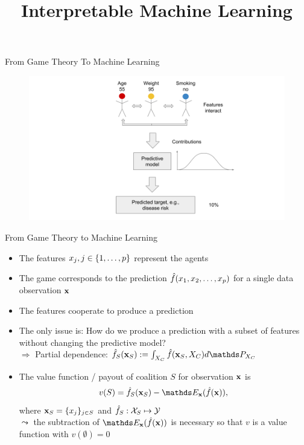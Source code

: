 \documentclass[11pt,compress,t,notes=noshow, aspectratio=169, xcolor=table]{beamer}
\title{Interpretable Machine Learning}
\date{}
\begin{document}
\newcommand{\titlefigure}{figure_man/bike-sharing03.png}
\newcommand{\learninggoals}{
\item See model predictions as a cooperative game
\item Transfer the Shapley value concept from game theory to machine learning
}



\begin{frame}{From Game Theory To Machine Learning}

\begin{figure}
    \centering
    \includegraphics{figure/Shapley_6.png}
\end{figure}

\end{frame}

\begin{frame}{From Game Theory to Machine Learning}
\begin{itemize}
    \itemsep1em
    \item The features $x_j, j \in \pset$ represent the agents
    \item The game corresponds to the prediction $\fh(x_1, x_2, \ldots, x_p)$ for a single data observation $\xv$
    \item The features cooperate to produce a prediction
    \item The only issue is: How do we produce a prediction with a subset of features without changing the predictive model?
    \\ $\Rightarrow$ Partial dependence: $\fh_{S}(\xv_S) := \int_{X_C} \fh(\xv_S, X_C)d \P_{X_C}$
    \item  The value function / payout of coalition $S$ for observation $\xv$ is
    $$v(S) =  \fh_{S} (\xv_S) - \E_{\xv}(\fh(\xv)),$$ 
    where $\xv_S = \{x_j\}_{j \in S}$ and $\fh_S: \Xspace_S \mapsto \Yspace$ \\ $\leadsto$ the subtraction of $\E_{\xv}(\fh(\xv))$ is necessary so that $v$ is a value function with $v(\emptyset) = 0$
\end{itemize}
\end{frame}
\end{document}

